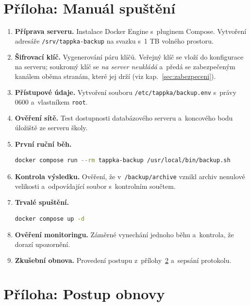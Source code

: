 \documentclass[11pt,a4paper]{article}
\begin{document}
\section{Příloha: Manuál spuštění}

\begin{enumerate}[leftmargin=1.6em]
  \item \textbf{Příprava serveru.} Instalace Docker Engine s~pluginem Compose. Vytvoření adresáře
        \texttt{/srv/tappka-backup} na svazku s~1 TB volného prostoru.
  \item \textbf{Šifrovací klíč.} Vygenerování páru klíčů. Veřejný klíč se vloží do konfigurace na
        serveru; soukromý klíč se \emph{na server neukládá} a~předá se zabezpečeným kanálem
        oběma stranám, které jej drží (viz kap.~\ref{sec:zabezpeceni}).
  \item \textbf{Přístupové údaje.} Vytvoření souboru \texttt{/etc/tappka/backup.env} s~právy 0600
        a~vlastníkem \texttt{root}.
  \item \textbf{Ověření sítě.} Test dostupnosti databázového serveru a~koncového bodu úložiště
        ze serveru školy.
  \item \textbf{První ruční běh.}
        \begin{lstlisting}[language=bash]
docker compose run --rm tappka-backup /usr/local/bin/backup.sh
        \end{lstlisting}
  \item \textbf{Kontrola výsledku.} Ověření, že v~\texttt{/backup/archive} vznikl archiv nenulové
        velikosti a~odpovídající soubor s~kontrolním součtem.
  \item \textbf{Trvalé spuštění.}
        \begin{lstlisting}[language=bash]
docker compose up -d
        \end{lstlisting}
  \item \textbf{Ověření monitoringu.} Záměrné vynechání jednoho běhu a~kontrola, že dorazí
        upozornění.
  \item \textbf{Zkušební obnova.} Provedení postupu z~přílohy~\ref{sec:obnova} a~sepsání protokolu.
\end{enumerate}

\section{Příloha: Postup obnovy}
\label{sec:obnova}
\end{document}
